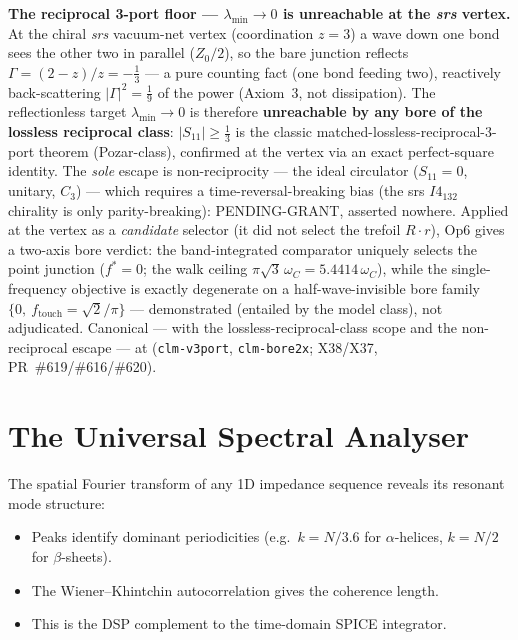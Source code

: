 \medskip\noindent\textbf{The reciprocal 3-port floor --- $\lambda_\text{min}\to0$ is unreachable at the \emph{srs} vertex.} At the chiral \emph{srs} vacuum-net vertex (coordination $z=3$) a wave down one bond sees the other two in parallel ($Z_0/2$), so the bare junction reflects $\Gamma = (2-z)/z = -\tfrac13$ --- a pure counting fact (one bond feeding two), reactively back-scattering $|\Gamma|^2 = \tfrac19$ of the power (Axiom~3, not dissipation). The reflectionless target $\lambda_\text{min}\to0$ is therefore \textbf{unreachable by any bore of the lossless reciprocal class}: $|S_{11}|\ge\tfrac13$ is the classic matched-lossless-reciprocal-3-port theorem (Pozar-class), confirmed at the vertex via an exact perfect-square identity. The \emph{sole} escape is non-reciprocity --- the ideal circulator ($S_{11}=0$, unitary, $C_3$) --- which requires a time-reversal-breaking bias (the srs $I4_132$ chirality is only parity-breaking): PENDING-GRANT, asserted nowhere. Applied at the vertex as a \emph{candidate} selector (it did not select the trefoil $R\!\cdot\!r$), Op6 gives a two-axis bore verdict: the band-integrated comparator uniquely selects the point junction ($f^{*}=0$; the walk ceiling $\pi\sqrt3\,\omega_C = 5.4414\,\omega_C$), while the single-frequency objective is exactly degenerate on a half-wave-invisible bore family $\{0,\ f_\text{touch}=\sqrt2/\pi\}$ --- demonstrated (entailed by the model class), not adjudicated. Canonical --- with the lossless-reciprocal-class scope and the non-reciprocal escape --- at  (\texttt{clm-v3port}, \texttt{clm-bore2x}; X38/X37, PR~\#619/\#616/\#620).

\section{The Universal Spectral Analyser}
\label{sec:universal_spectral}

The spatial Fourier transform of any 1D impedance sequence reveals
its resonant mode structure:
\begin{itemize}
    \item Peaks identify dominant periodicities
      (e.g.\ $k = N/3.6$ for $\alpha$-helices, $k = N/2$ for $\beta$-sheets).
    \item The Wiener--Khintchin autocorrelation gives the coherence length.
    \item This is the DSP complement to the time-domain SPICE integrator.
\end{itemize}

